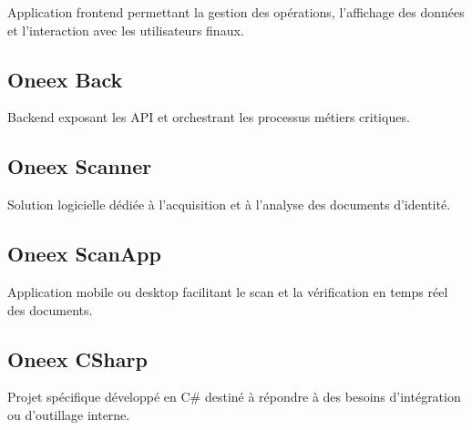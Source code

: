 Application frontend permettant la gestion des opérations, l’affichage des données et l’interaction avec les utilisateurs finaux.

\subsection{Oneex Back}

Backend exposant les API et orchestrant les processus métiers critiques.

\subsection{Oneex Scanner}

Solution logicielle dédiée à l’acquisition et à l’analyse des documents d’identité.

\subsection{Oneex ScanApp}

Application mobile ou desktop facilitant le scan et la vérification en temps réel des documents.

\subsection{Oneex CSharp}

Projet spécifique développé en C\# destiné à répondre à des besoins d’intégration ou d’outillage interne.
